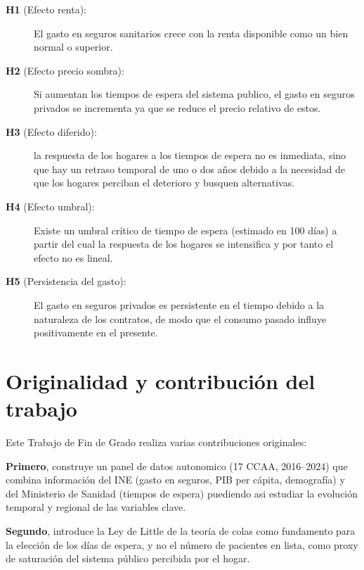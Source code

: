 \begin{description}
  \item[\textbf{H1} (Efecto renta):] El gasto en seguros sanitarios crece con la renta disponible 
    como un bien normal o superior.
  
  \item[\textbf{H2} (Efecto precio sombra):] Si aumentan los tiempos de espera del sistema 
    publico, el gasto en seguros privados se incrementa ya que se reduce el precio relativo de estos.

  \item[\textbf{H3} (Efecto diferido):] la respuesta de los hogares a los tiempos de 
    espera no es inmediata, sino que hay un retraso temporal de uno o dos años 
    debido a la necesidad de que los hogares perciban el deterioro y busquen alternativas.

  \item[\textbf{H4} (Efecto umbral):] Existe un umbral crítico de tiempo de espera
    (estimado en 100 días) a partir del cual la respuesta de los hogares
    se intensifica y por tanto el efecto no es lineal.

  \item[\textbf{H5} (Persistencia del gasto):] El gasto en seguros privados es persistente en el
    tiempo debido a la naturaleza de los contratos, de modo que el consumo pasado influye
    positivamente en el presente. 
\end{description}

\section{Originalidad y contribución del trabajo}

Este Trabajo de Fin de Grado realiza varias contribuciones originales:

\textbf{Primero}, construye un panel de datos autonomico (17 CCAA,
2016--2024) que combina información del INE (gasto en seguros, PIB per cápita,
demografía) y del Ministerio de Sanidad (tiempos de espera) puediendo asi estudiar la evolución
temporal y regional de las variables clave.

\textbf{Segundo}, introduce la Ley de Little de la teoría de colas como
fundamento para la elección de los días de espera, y no el número de pacientes
en lista, como proxy de saturación del sistema público percibida por el
hogar.

